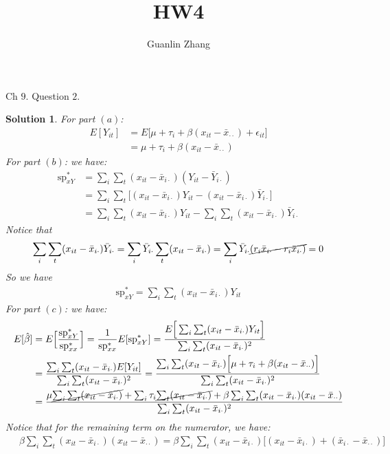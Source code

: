 \documentclass[11pt]{article}
\title{HW4}
\author{Guanlin Zhang}
\newtheorem{sol}{Solution}
\begin{document}
Ch $9.$ Question $2$.
\begin{sol}
For part $(a)$:\vskip 2mm
\begin{align*}
	E[Y_{it}] &= E\Big[\mu + \tau_i + \beta(x_{it} - \bar{x}_{\cdot\cdot}) + \epsilon_{it}\Big]\\
	&= \mu + \tau_i + \beta(x_{it} - \bar{x}_{\cdot\cdot})
\end{align*}
\vskip 2mm
For part $(b)$:\vskip 2mm
we have:
\begin{align*}
	\text{sp}^{\ast}_{xY} &= \sum_i\sum_t(x_{it} - \bar{x}_{i\cdot})(Y_{it} - \bar{Y}_{i\cdot})\\
	&= \sum_i\sum_t\Big[(x_{it} - \bar{x}_{i\cdot})Y_{it} - (x_{it} - \bar{x}_{i\cdot})\bar{Y}_{i\cdot}\Big]\\
	&= \sum_i\sum_t(x_{it} - \bar{x}_{i\cdot})Y_{it} - \sum_i\sum_t(x_{it} - \bar{x}_{i\cdot})\bar{Y}_{i\cdot}
\end{align*}
Notice that
\begin{align*}
	\sum_i\sum_t(x_{it} - \bar{x}_{i\cdot})\bar{Y}_{i\cdot} = \sum_i\bar{Y}_{i\cdot}\sum_t(x_{it} - \bar{x}_{i\cdot}) = \sum_i\bar{Y}_{i\cdot}\cancel{(r_i\bar{x}_{i\cdot} - r_i\bar{x}_{i\cdot})}  =0
\end{align*}
So we have
\begin{align*}
	\text{sp}^{\ast}_{xY} = \sum_i\sum_t(x_{it} - \bar{x}_{i\cdot})Y_{it}
\end{align*}
For part $(c)$:\vskip 2mm
we have:
\begin{align*}
	E[\hat{\beta}]&= E\Big[\frac{\text{sp}^{\ast}_{xY}}{\text{sp}^{\ast}_{xx}}\Big]
	= \frac{1}{\text{sp}^{\ast}_{xx}}E[\text{sp}^{\ast}_{xY}] = \frac{E\Big[\sum_i\sum_t (x_{it} - \bar{x}_{i\cdot})Y_{it}\Big]}{\sum_i\sum_t(x_{it} - \bar{x}_{i\cdot})^2}\\
	&= \frac{\sum_i\sum_t(x_{it} - \bar{x}_{i\cdot})E[Y_{it}]}{\sum_i\sum_t(x_{it} - \bar{x}_{i\cdot})^2}
	= \frac{\sum_i\sum_t(x_{it} - \bar{x}_{i\cdot})\Big[\mu+ \tau_i + \beta(x_{it} - \bar{x}_{\cdot\cdot})\Big]}{\sum_i\sum_t(x_{it} - \bar{x}_{i\cdot})^2}\\
	&= \frac{\mu\cancel{\sum_i\sum_t(x_{it} - \bar{x}_{i\cdot})} + \sum_i\tau_i\cancel{\sum_t(x_{it} - \bar{x}_{i\cdot})} + \beta\sum_i\sum_t(x_{it} - \bar{x}_{i\cdot})(x_{it} - \bar{x}_{\cdot\cdot})}{\sum_i\sum_t(x_{it} - \bar{x}_{i\cdot})^2}
\end{align*}
Notice that for the remaining term on the numerator, we have:
\begin{align*}
	 &\ \beta\sum_i\sum_t(x_{it} - \bar{x}_{i\cdot})(x_{it} - \bar{x}_{\cdot\cdot}) = \beta\sum_i\sum_t(x_{it} - \bar{x}_{i\cdot})\Big[(x_{it} - \bar{x}_{i\cdot})+(\bar{x}_{i\cdot} - \bar{x}_{\cdot\cdot})\Big]\\

\end{align*}
\end{sol}
\end{document}
